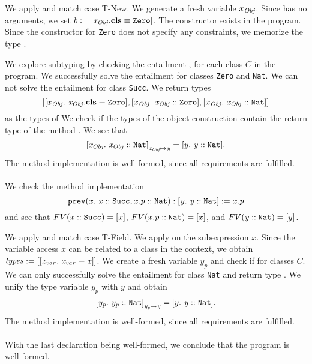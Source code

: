 \begin{example}
We apply 
and match case T-New.
We generate a fresh variable $x_{\mathit{Obj}}$.
Since  has no arguments,
we set $b := [\mathit{x_{\mathit{Obj}}}.\textbf{cls} \equiv \mathit{\texttt{Zero}}]$.
The constructor  exists in the program.
Since the constructor for \texttt{Zero} does not specify any constraints,
we memorize the type
.

We explore subtyping by checking the entailment
\entails
  {
    ,
  }
  {}
for each class $C$ in the program.
We successfully solve the entailment for
classes \texttt{Zero} and \texttt{Nat}.
We can not solve the entailment for class \texttt{Succ}.
We return types
\[ [ \type{x_{\mIt{Obj}}}{\instBy{x_{\mIt{Obj}}}{\texttt{Zero}}},\\
     \type{x_{\mIt{Obj}}}{\instOf{x_{\mIt{Obj}}}{\texttt{Zero}}},\\
     \type{x_{\mIt{Obj}}}{\instOf{x_{\mIt{Obj}}}{\texttt{Nat}}} ] \]
as the types of 
We check if the types of the object construction contain
the return type of the method .
We see that
\[\mathit{ [x_{\mathit{Obj}}.\ \mathit{\mathit{x_{\mathit{Obj}}} :: \mathit{\texttt{Nat}}}] }_{\mathit{x_{\mathit{Obj}}} \mapsto \mathit{y}}
 = [y.\ \mathit{\mathit{y} :: \mathit{\texttt{Nat}}}]. \]
The method implementation is well-formed,
since all requirements are fulfilled.\\
\\
We check the method implementation
\[
  \mathit{\texttt{prev}}(\mathit{x}.\ \mathit{\mathit{x} :: \mathit{\texttt{Succ}}, \mathit{x.p} :: \mathit{\texttt{Nat}}}): \mathit{[y.\ \mathit{\mathit{y} :: \mathit{\texttt{Nat}}}]} := \mathit{x.p}
\]
and see that
$FV(\mathit{x} :: \mathit{\texttt{Succ}}) = [x]$,
$FV(\mathit{x.p} :: \mathit{\texttt{Nat}}) = [x]$,
and
$FV(\mathit{y} :: \mathit{\texttt{Nat}}) = [y]$.

We apply 
and match case T-Field.
We apply  on the subexpression $x$.
Since the variable access $x$ can be related to a class in the context,
we obtain $\mathit{types := [[x_{\mathit{var}}.\ \mathit{\mathit{x_{\mathit{var}}} \equiv \mathit{x}}]]}$.
We create a fresh variable $y_p$
and check if
        {}
for classes $C$.
We can only successfully solve the entailment for class \texttt{Nat}
and return type .
We unify the type variable $y_p$ with $y$ and obtain
\[ \mathit{[y_p.\ \mathit{\mathit{y_p} :: \mathit{\texttt{Nat}}}]}_{\mathit{y_p} \mapsto \mathit{y}}
    = [y.\ \mathit{\mathit{y} :: \mathit{\texttt{Nat}}}]. \]
The method implementation is well-formed,
since all requirements are fulfilled.\\
\\
With the last declaration being well-formed,
we conclude that the program is well-formed.
\end{example}

